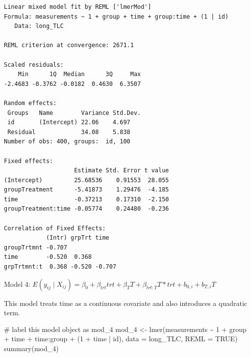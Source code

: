 \documentclass[
  letterpaper,
  DIV=11,
  numbers=noendperiod]{scrreprt}
\newenvironment{Shaded}{\begin{snugshade}}{\end{snugshade}}
\newcommand{\AttributeTok}[1]{\textcolor[rgb]{0.40,0.45,0.13}{#1}}
\newcommand{\CommentTok}[1]{\textcolor[rgb]{0.37,0.37,0.37}{#1}}
\newcommand{\ConstantTok}[1]{\textcolor[rgb]{0.56,0.35,0.01}{#1}}
\newcommand{\DecValTok}[1]{\textcolor[rgb]{0.68,0.00,0.00}{#1}}
\newcommand{\FunctionTok}[1]{\textcolor[rgb]{0.28,0.35,0.67}{#1}}
\newcommand{\NormalTok}[1]{\textcolor[rgb]{0.00,0.23,0.31}{#1}}
\newcommand{\OtherTok}[1]{\textcolor[rgb]{0.00,0.23,0.31}{#1}}
\newcommand{\SpecialCharTok}[1]{\textcolor[rgb]{0.37,0.37,0.37}{#1}}
\begin{document}
\begin{verbatim}
Linear mixed model fit by REML ['lmerMod']
Formula: measurements ~ 1 + group + time + group:time + (1 | id)
   Data: long_TLC

REML criterion at convergence: 2671.1

Scaled residuals: 
    Min      1Q  Median      3Q     Max 
-2.4683 -0.3762 -0.0182  0.4630  6.3507 

Random effects:
 Groups   Name        Variance Std.Dev.
 id       (Intercept) 22.06    4.697   
 Residual             34.08    5.838   
Number of obs: 400, groups:  id, 100

Fixed effects:
                    Estimate Std. Error t value
(Intercept)         25.68536    0.91553  28.055
groupTreatment      -5.41873    1.29476  -4.185
time                -0.37213    0.17310  -2.150
groupTreatment:time -0.05774    0.24480  -0.236

Correlation of Fixed Effects:
            (Intr) grpTrt time  
groupTrtmnt -0.707              
time        -0.520  0.368       
grpTrtmnt:t  0.368 -0.520 -0.707
\end{verbatim}

\begin{center}
Model 4: $E(y_{ij} \mid X_{ij}) = \beta_0 +  \beta_{trt}trt +  \beta_{T}T + \beta_{trt:T}T*trt+b_{0,i} + b_{T,i}T$
\end{center}

This model treats time as a continuous covariate and also introduces a
quadratic term.

\begin{Shaded}
\begin{Highlighting}[]
\CommentTok{\# label this model object as mod\_4}
\NormalTok{mod\_4 }\OtherTok{\textless{}{-}} \FunctionTok{lmer}\NormalTok{(measurements }\SpecialCharTok{\textasciitilde{}} \DecValTok{1} \SpecialCharTok{+}\NormalTok{ group }\SpecialCharTok{+}\NormalTok{ time }\SpecialCharTok{+}\NormalTok{ time}\SpecialCharTok{:}\NormalTok{group }\SpecialCharTok{+}\NormalTok{ (}\DecValTok{1} \SpecialCharTok{+}\NormalTok{ time }\SpecialCharTok{|}\NormalTok{ id), }\AttributeTok{data =}\NormalTok{ long\_TLC,}
    \AttributeTok{REML =} \ConstantTok{TRUE}\NormalTok{)}
\FunctionTok{summary}\NormalTok{(mod\_4)}
\end{Highlighting}
\end{Shaded}
\end{document}
